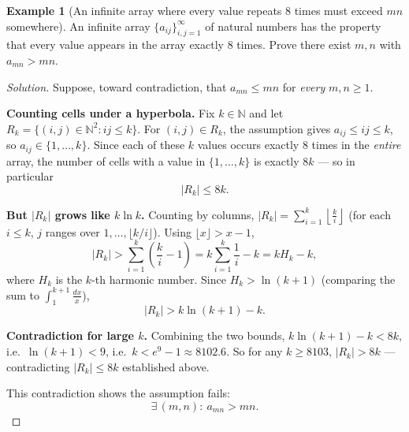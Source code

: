 \documentclass[11pt]{article}
\theoremstyle{definition}
\newtheorem{example}{Example}[section]
\newcommand{\N}{\mathbb{N}}
\begin{document}
\begin{example}[An infinite array where every value repeats $8$ times must exceed $mn$ somewhere]
An infinite array $\{a_{ij}\}_{i,j=1}^\infty$ of natural numbers has the property that every value appears in the array exactly $8$ times. Prove there exist $m,n$ with $a_{mn}>mn$.
\end{example}
\begin{proof}[Solution]
Suppose, toward contradiction, that $a_{mn}\le mn$ for \emph{every} $m,n\ge1$.

\textbf{Counting cells under a hyperbola.} Fix $k\in\N$ and let $R_k=\{(i,j)\in\N^2:ij\le k\}$. For $(i,j)\in R_k$, the assumption gives $a_{ij}\le ij\le k$, so $a_{ij}\in\{1,\dots,k\}$. Since each of these $k$ values occurs exactly $8$ times in the \emph{entire} array, the number of cells with a value in $\{1,\dots,k\}$ is exactly $8k$ — so in particular
\[
|R_k|\le8k.
\]

\textbf{But $|R_k|$ grows like $k\ln k$.} Counting by columns, $|R_k|=\sum_{i=1}^k\left\lfloor\frac ki\right\rfloor$ (for each $i\le k$, $j$ ranges over $1,\dots,\lfloor k/i\rfloor$). Using $\lfloor x\rfloor>x-1$,
\[
|R_k|>\sum_{i=1}^k\left(\frac ki-1\right)=k\sum_{i=1}^k\frac1i-k=k H_k-k,
\]
where $H_k$ is the $k$-th harmonic number. Since $H_k>\ln(k+1)$ (comparing the sum to $\int_1^{k+1}\frac{dx}x$),
\[
|R_k|>k\ln(k+1)-k.
\]

\textbf{Contradiction for large $k$.} Combining the two bounds, $k\ln(k+1)-k<8k$, i.e.\ $\ln(k+1)<9$, i.e.\ $k<e^9-1\approx8102.6$. So for any $k\ge8103$, $|R_k|>8k$ — contradicting $|R_k|\le8k$ established above.

This contradiction shows the assumption fails:
\[
\boxed{\exists\,(m,n):\ a_{mn}>mn}.
\]
\end{proof}
\end{document}

